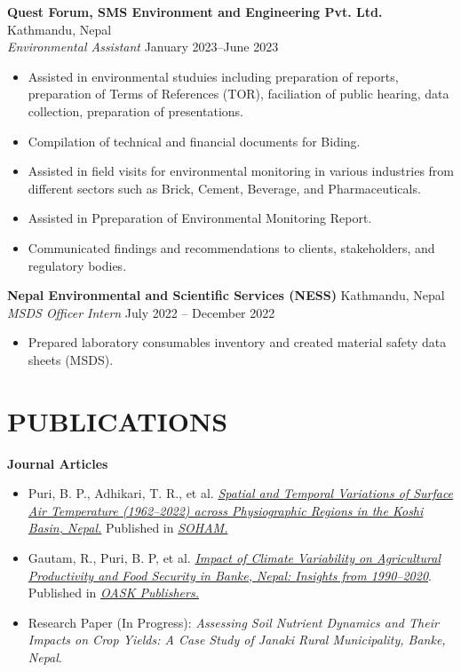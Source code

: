 \documentclass[a4paper, 09pt]{extarticle}
\begin{document}
\noindent
\textbf{Quest Forum, SMS Environment and Engineering Pvt. Ltd.} \hfill Kathmandu, Nepal\\[2pt] 
\textit{Environmental Assistant} \hfill January 2023--June 2023
\begin{itemize}
    \item Assisted in environmental studuies including preparation of reports, preparation of Terms of References (TOR), faciliation of public hearing, data collection, preparation of presentations.
    \item Compilation of technical and financial documents for Biding.
    \item Assisted in field visits for environmental monitoring in various industries from different sectors such as Brick, Cement, Beverage, and Pharmaceuticals.
    \item Assisted in Ppreparation of Environmental Monitoring Report.
    \item Communicated findings and recommendations to clients, stakeholders, and regulatory bodies.
\end{itemize}

\noindent
\textbf{Nepal Environmental and Scientific Services (NESS)} \hfill Kathmandu, Nepal\\[2pt] 
\textit{MSDS Officer Intern} \hfill July 2022 -- December 2022
\begin{itemize}
    \item Prepared laboratory consumables inventory and created material safety data sheets (MSDS).
\end{itemize}

\section*{PUBLICATIONS}
\noindent
\textbf{Journal Articles}
\begin{itemize}
    \item Puri, B. P., Adhikari, T. R., et al. \href{https://doi.org/10.3126/jhm.v12i1.72654}{\textit{Spatial and Temporal Variations of Surface Air Temperature (1962–2022) across Physiographic Regions in the Koshi Basin, Nepal.}} Published in \href{https://soham.org.np/}{\textit{SOHAM.}}
    \item Gautam, R., Puri, B. P, et al. \href{https://oaskpublishers.com/assets/article-pdf/impact-of-climate-variability-on-agricultural-productivity-and-food-security--in-banke-nepal-insights-from-1990-2020.pdf}{\textit{Impact of Climate Variability on Agricultural Productivity and Food Security in Banke, Nepal: Insights from 1990--2020}}. Published in \href{https://oaskpublishers.com/}{\textit{OASK Publishers.}}
    \item Research Paper (In Progress): \textit{Assessing Soil Nutrient Dynamics and Their Impacts on Crop Yields: A Case Study of Janaki Rural Municipality, Banke, Nepal}. 
\end{itemize}
\end{document}
